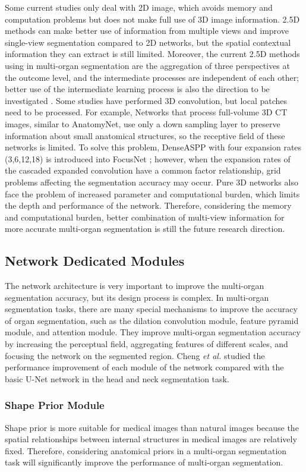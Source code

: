 \documentclass[lettersize,journal]{IEEEtran}
\begin{document}
Some current studies only deal with 2D image, which avoids memory and computation problems but does not make full use of 3D image information. 2.5D methods can make better use of information from multiple views and improve single-view segmentation compared to 2D networks, but the spatial contextual information they can extract is still limited. Moreover, the current 2.5D methods using in multi-organ segmentation are the aggregation of three perspectives at the outcome level, and the intermediate processes are independent of each other; better use of the intermediate learning process is also the direction to be investigated \cite{158,159,160}. Some studies have performed 3D convolution, but local patches need to be processed. For example, Networks that process full-volume 3D CT images, similar to AnatomyNet, use only a down sampling layer to preserve information about small anatomical structures, so the receptive field of these networks is limited. To solve this problem, DenseASPP with four expansion rates (3,6,12,18) is introduced into FocusNet \cite{142}; however, when the expansion rates of the cascaded expanded convolution have a common factor relationship, grid problems affecting the segmentation accuracy may occur. Pure 3D networks also face the problem of increased parameter and computational burden, which limits the depth and performance of the network. Therefore, considering the memory and computational burden, better combination of multi-view information for more accurate multi-organ segmentation is still the future research direction.

\subsection{Network Dedicated Modules}
\label{sec4_3}
The network architecture is very important to improve the multi-organ segmentation accuracy, but its design process is complex. In multi-organ segmentation tasks, there are many special mechanisms to improve the accuracy of organ segmentation, such as the dilation convolution module, feature pyramid module, and attention module. They improve multi-organ segmentation accuracy by increasing the perceptual field, aggregating features of different scales, and focusing the network on the segmented region. Cheng {\it{et al.}} \cite{184} studied the performance improvement of each module of the network compared with the basic U-Net network in the head and neck segmentation task.

\subsubsection{Shape Prior Module}
Shape prior is more suitable for medical images than natural images because the spatial relationships between internal structures in medical images are relatively fixed. Therefore, considering anatomical priors in a multi-organ segmentation task will significantly improve the performance of multi-organ segmentation.
\end{document}
